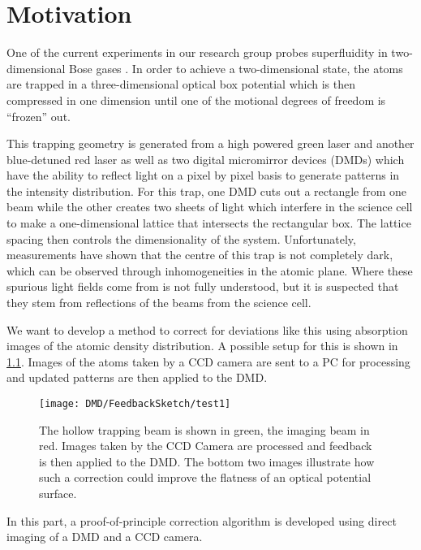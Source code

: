 

\chapter{Motivation}
\label{cha:dmd_motivation}
One of the current experiments in our research group probes superfluidity in two-di\-men\-sional Bose gases \cite{christodoulou2020observation}. In order to achieve a two-dimensional state, the atoms are trapped in a three-dimensional optical box potential which is then compressed in one dimension until one of the motional degrees of freedom is \enquote{frozen} out. 

This trapping geometry is generated from a high powered green laser and another blue-detuned red laser as well as two digital micromirror devices (DMDs) which have the ability to reflect light on a pixel by pixel basis to generate patterns in the intensity distribution. For this trap, one DMD cuts out a rectangle from one beam while the other creates two sheets of light which interfere in the science cell to make a one-dimensional lattice that intersects the rectangular box. The lattice spacing then controls the dimensionality of the system. 
Unfortunately, measurements have shown that the centre of this trap is not completely dark, which can be observed through inhomogeneities in the atomic plane. Where these spurious light fields come from is not fully understood, but it is suspected that they stem from reflections of the beams from the science cell.

We want to develop a method to correct for deviations like this using absorption images of the atomic density distribution. A possible setup for this is shown in \cref{fig:dmd_feedback_sketch}. Images of the atoms taken by a CCD camera are sent to a PC for processing and updated patterns are then applied to the DMD.
\begin{figure}[htbp]
    \centering
    \texttt{[image: DMD/FeedbackSketch/test1]}
    \caption[Proposed setup for adaptive corrections to the DMD pattern]{The hollow trapping beam is shown in green, the imaging beam in red. Images taken by the CCD Camera are processed and feedback is then applied to the DMD. The bottom two images illustrate how such a correction could improve the flatness of an optical potential surface.}
    \label{fig:dmd_feedback_sketch}
\end{figure}

In this part, a proof-of-principle correction algorithm is developed using direct imaging of a DMD and a CCD camera.